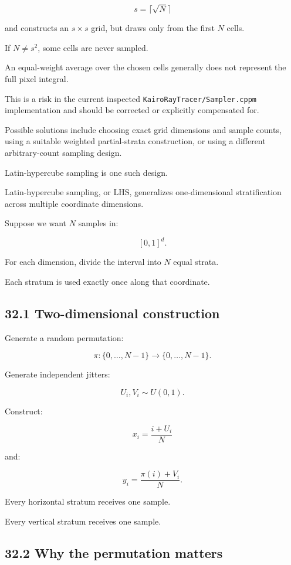 \[ s=\lceil\sqrt N\rceil \]

and constructs an \(s\times s\) grid, but draws only from the first \(N\) cells.

If \(N\ne s^2\), some cells are never sampled.

An equal-weight average over the chosen cells generally does not represent the full pixel integral.

This is a risk in the current inspected \texttt{KairoRayTracer/Sampler.cppm} implementation and should be corrected or explicitly compensated for.

Possible solutions include choosing exact grid dimensions and sample counts, using a suitable weighted partial-strata construction, or using a different arbitrary-count sampling design.

Latin-hypercube sampling is one such design.

Latin-hypercube sampling, or LHS, generalizes one-dimensional stratification across multiple coordinate dimensions.

Suppose we want \(N\) samples in:

\[ [0,1]^d. \]

For each dimension, divide the interval into \(N\) equal strata.

Each stratum is used exactly once along that coordinate.

\subsection{32.1 Two-dimensional construction}\label{02-foundations-ii-ch031-two-dimensional-construction}

Generate a random permutation:

\[ \pi:\{0,\ldots,N-1\}\rightarrow\{0,\ldots,N-1\}. \]

Generate independent jitters:

\[ U_i,V_i\sim U(0,1). \]

Construct:

\[ \boxed{ x_i=\frac{i+U_i}{N} } \]

and:

\[ \boxed{ y_i=\frac{\pi(i)+V_i}{N} }. \]

Every horizontal stratum receives one sample.

Every vertical stratum receives one sample.

\subsection{32.2 Why the permutation matters}\label{02-foundations-ii-ch031-why-the-permutation-matters}

